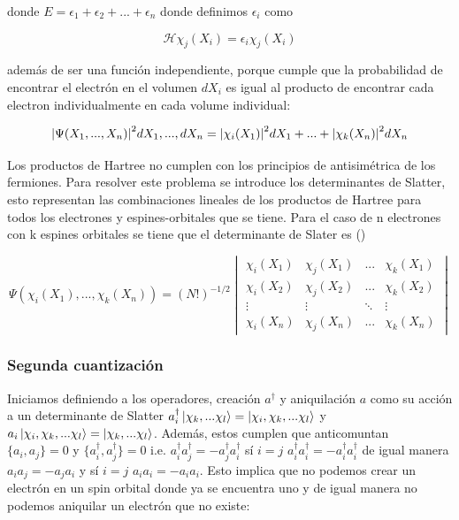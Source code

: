 \documentclass[12pt, oneside]{article}
\begin{document}
donde $E=\epsilon_1+\epsilon_2+...+\epsilon_n$ donde definimos $\epsilon_i$ como 

\begin{equation}
    \mathscr{H}\chi_j(X_i)=\epsilon_i\chi_j(X_i)
\end{equation}

además de ser una función independiente, porque cumple que la probabilidad de encontrar el electrón en el volumen $dX_i$ es igual al producto de encontrar cada electron individualmente en cada volume individual:

\begin{equation}
    \abs{\Psi(X_1,...,X_n)}^2dX_1,...,dX_n=\abs{\chi_i(X_1)}^2dX_1+...+\abs{\chi_k(X_n)}^2dX_n
\end{equation}

Los productos de Hartree no cumplen con los principios de antisimétrica de los fermiones. Para resolver este problema se introduce los determinantes de Slatter, esto representan las combinaciones lineales de los productos de Hartree para todos los electrones y espines-orbitales que se tiene. Para el caso de n electrones con k espines orbitales se tiene que el determinante de Slater es (\cite{szabo1996modern}) 

\begin{equation}
    \Psi(\chi_i(X_1),...,\chi_k(X_n))=(N!)^{-1/2}\begin{vmatrix}
        \chi_i(X_1)&\chi_j(X_1)&...&\chi_k(X_1)\\
        \chi_i(X_2)&\chi_j(X_2)&...&\chi_k(X_2)\\
        \vdots&\vdots&\ddots&\vdots\\
        \chi_i(X_n)&\chi_j(X_n)&...&\chi_k(X_n)
    \end{vmatrix}
\end{equation}

\subsubsection{Segunda cuantización}

Iniciamos definiendo a los operadores, creación $a^\dagger$ y aniquilación $a$ como su acción a un determinante de Slatter $a_i^\dagger\ket{\chi_k,...\chi_l}=\ket{\chi_i,\chi_k,...\chi_l}$ y $a_i\ket{\chi_i,\chi_k,...\chi_l}=\ket{\chi_k,...\chi_l}$. Además, estos cumplen que anticomuntan $\{a_i,a_j\}=0$ y  $\{a_i^\dagger,a_j^\dagger\}=0$ i.e. $a_i^\dagger a_j^\dagger=-a_j^\dagger a_i^\dagger$ sí $i=j$ $a_i^\dagger a_i^\dagger=-a_i^\dagger a_i^\dagger$ de igual manera $a_i a_j=-a_j a_i$ y sí $i=j$ $a_i a_i=-a_i a_i$. Esto implica que no podemos crear un electrón en un spin orbital donde ya se encuentra uno y de igual manera no podemos aniquilar un electrón que no existe:
\end{document}
